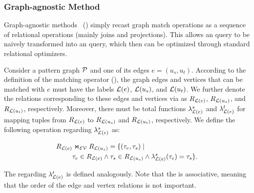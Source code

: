 
\subsubsection{Graph-agnostic Method}
\label{sec:intuitive-method}
Graph-agnostic methods~\cite{apache-age,DuckPGQ,DuckPGQ-VLDB} () simply recast graph match operations
as a sequence of relational operations (mainly joins and projections). This allows an \spjm query to be naively transformed into an \spj query, which then can be optimized through standard relational optimizers.

Consider a pattern graph $\mathcal{P}$ and one of its edges $e = (u_s, u_t)$. According to the definition of the matching operator (), the graph edges and vertices that can be matched with $e$ must have the labels $\mathcal{L}(e)$, $\mathcal{L}(u_s)$, and $\mathcal{L}(u_t)$. We further denote the relations corresponding to these edges and vertices via \rgmapping as $R_{\mathcal{L}(e)}$, $R_{\mathcal{L}(u_s)}$, and $R_{\mathcal{L}(u_t)}$, respectively. Moreover, there must be total functions $\lambda_{\mathcal{L}(e)}^s$ and $\lambda_{\mathcal{L}(e)}^t$ for mapping tuples from $R_{\mathcal{L}(e)}$ to $R_{\mathcal{L}(u_s)}$ and $R_{\mathcal{L}(u_t)}$, respectively. We define the following \EVjoin operation regarding $\lambda_{\mathcal{L}(e)}^s$ as:

\begin{equation} \label{eq:ev-join}
\begin{split}
R_{\mathcal{L}(e)} & \Join_\mathcal{EV} R_{\mathcal{L}(u_s)} = \{(\tau_e, \tau_s) \;|\; \\
  &  \tau_e \in R_{\mathcal{L}(e)} \land \tau_s \in R_{\mathcal{L}(u_s)} \land \lambda_{\mathcal{L}(e)}^s(\tau_e) = \tau_s\}.
\end{split}
\end{equation}

The \EVjoin regarding $\lambda_{\mathcal{L}(e)}^t$ is defined analogously. Note that the \EVjoin is associative, meaning that the order of the edge and vertex relations is not important.


